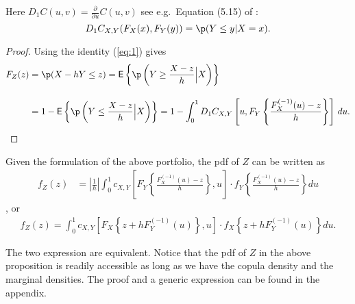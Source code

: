 Here $D_1 C(u,v)=\displaystyle \frac{\partial}{\partial u} C(u,v)$ see e.g.\ Equation (5.15) of
\citep{McNeil2005}:
\begin{equation}
  \label{eq:1}
  D_1 C_{X,Y}(F_X(x), F_Y(y)) = \p(Y\leq y|X=x).
\end{equation}
\begin{proof}
  Using the identity (\ref{eq:1}) gives
  \begin{align*}
    F_{Z}(z) &= \p(X - h Y\leq z) %
                 = \mbox{\sf E}\left\{\p\left(Y\geq \frac{X-z}{h}\Big|
                 X\right)\right\}\\[10pt]
               &= 1-\mbox{\sf E}\left\{\p\left(Y\leq \frac{X-z}{h}\Big|
                 X\right)\right\}%
               = 1- \int_0^1 D_1 C_{X, Y}\left[u,
                 F_{Y}\left\{\frac{F^{(-1)}_{X}(u) -
                 z}{h}\right\}\right]\, d u.
  \end{align*}
  \end{proof}


\begin{corollary} Given the formulation of the above portfolio, the pdf of $Z$ can be written as
  \begin{align}
  f_{Z}(z) &= \left|\frac{1}{h}\right|\int_0^1 c_{X, Y} \left[
  F_{Y}\left\{\frac{F^{(-1)}_{X}(u)-z}{h}\right\}, u
  \right]
   \cdot
  f_{Y}
  \left\{\frac{F^{(-1)}_{X}(u)-z}{h}\right\} du \label{eq:density1}
  \end{align}, or
    \begin{align}
      f_{Z}(z)
      = \int_0^1 c_{X, Y} \left[
      F_{X}\left\{z + h F^{(-1)}_{Y}(u)\right\}, u
      \right]
       \cdot
      f_{X}
      \left\{
      z+ hF^{(-1)}_{Y}(u)
      \right\} du. \label{eq:density2}
  \end{align}
  \end{corollary}
The two expression are equivalent.
Notice that the pdf of $Z$ in the above proposition is readily accessible as long as we have
the copula density and the marginal densities.
The proof and a generic expression can be found in the
appendix. \medskip

%

